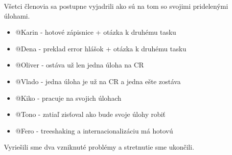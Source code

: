 \documentclass{article}
\begin{document}
        \textnormal {Všetci členovia sa postupne vyjadrili ako sú na tom so svojimi pridelenými úlohami.}
        \begin{itemize}
            \item {@Karin - hotové zápisnice + otázka k druhému tasku}
            \item {@Dena - preklad error hlášok + otázka k druhému tasku}
            \item {@Oliver - ostáva už len jedna úloha na CR}
            \item {@Vlado - jedna úloha je už na CR a jedna ešte zostáva}
            \item {@Kiko - pracuje na svojich úlohach}
            \item {@Tono - zatiaľ zisťoval ako bude svoje úlohy robiť}
            \item {@Fero - treeshaking a internacionalizáciu má hotovú}
        \end{itemize}

        \textnormal {Vyriešili sme dva vzniknuté problémy a stretnutie sme ukončili.}

    
\end{document}
